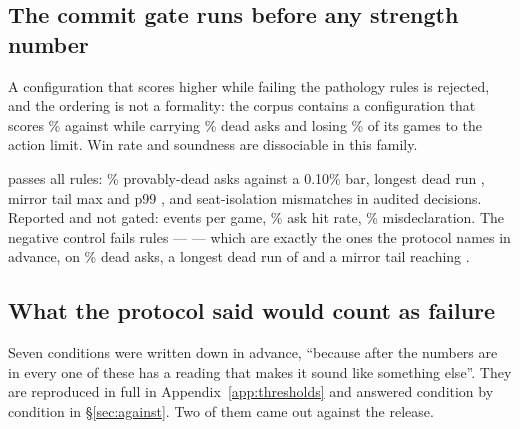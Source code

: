 \subsection{The commit gate runs before any strength number}
\label{sec:protocol-gate}

A configuration that scores higher while failing the pathology rules is rejected, and the ordering is
not a formality: the corpus contains a configuration that scores
\vsevenScoreboardTrapWin\% against \vfour{} while carrying \vsevenScoreboardTrapDead\% dead asks and
losing \vsevenScoreboardTrapLimit\% of its games to the action limit. Win rate and soundness are
dissociable in this family.

\begin{table}[t]\centering
\caption{The commit gate, eight rules, run on training material by design --- it is a soundness check
on self-play behaviour, not a strength claim. The negative control is the configuration the corpus
built to be rejected; a gate that could not reject it would certify nothing about the one it accepts.}
\label{tab:gate}
{\small}
\end{table}

\frozen{} passes all \vsevenGateRules{} rules: \vsevenGateDeadAsks\% provably-dead asks against a
0.10\% bar, longest dead run \vsevenGateLongestDead{}, mirror tail max \vsevenGateTailMax{} and p99
\vsevenGateTailPnn{}, and \vsevenGateSsix{} seat-isolation mismatches in \vsevenGateSsixNodes{}
audited decisions. Reported and not gated: \vsevenGateEvents{} events per game, \vsevenGateAskHit\%
ask hit rate, \vsevenGateMisdecl\% misdeclaration. The negative control fails
\vsevenNegFailCount{} rules --- \vsevenNegFails{} --- which are exactly the ones the protocol names in
advance, on \vsevenNegDeadAsks\% dead asks, a longest dead run of \vsevenNegLongestDead{} and a mirror
tail reaching \vsevenNegTailMax{}.

\subsection{What the protocol said would count as failure}
\label{sec:protocol-failure}

Seven conditions were written down in advance, ``because after the numbers are in every one of these
has a reading that makes it sound like something else''. They are reproduced in full in
Appendix~\ref{app:thresholds} and answered condition by condition in \S\ref{sec:against}. Two of them
came out against the release.

